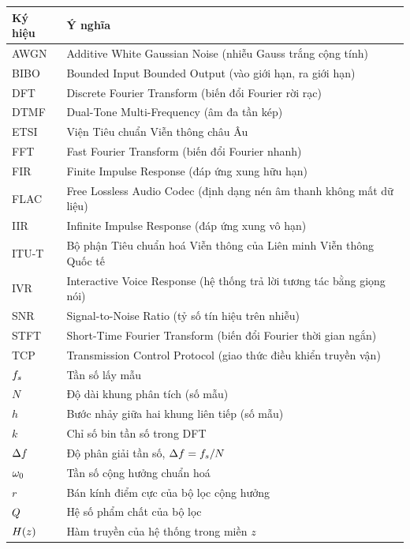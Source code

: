 \documentclass{dtmf_report}
\begin{document}
{\small{}%
\begin{longtable}{@{}p{2cm} p{\dimexpr\linewidth-2cm-2\tabcolsep\relax}@{}}
\toprule
\textbf{Ký hiệu} & \textbf{Ý nghĩa} \\
\midrule
\endhead
AWGN   & Additive White Gaussian Noise (nhiễu Gauss trắng cộng tính) \\
BIBO   & Bounded Input Bounded Output (vào giới hạn, ra giới hạn) \\
DFT    & Discrete Fourier Transform (biến đổi Fourier rời rạc) \\
DTMF   & Dual-Tone Multi-Frequency (âm đa tần kép) \\
ETSI   & Viện Tiêu chuẩn Viễn thông châu Âu \\
FFT    & Fast Fourier Transform (biến đổi Fourier nhanh) \\
FIR    & Finite Impulse Response (đáp ứng xung hữu hạn) \\
FLAC   & Free Lossless Audio Codec (định dạng nén âm thanh không mất dữ liệu) \\
IIR    & Infinite Impulse Response (đáp ứng xung vô hạn) \\
\mbox{ITU-T}  & Bộ phận Tiêu chuẩn hoá Viễn thông của Liên minh Viễn thông Quốc tế \\
IVR    & Interactive Voice Response (hệ thống trả lời tương tác bằng giọng nói) \\
SNR    & Signal-to-Noise Ratio (tỷ số tín hiệu trên nhiễu) \\
STFT   & Short-Time Fourier Transform (biến đổi Fourier thời gian ngắn) \\
TCP    & Transmission Control Protocol (giao thức điều khiển truyền vận) \\
\midrule
$f_{s}$        & Tần số lấy mẫu \\
$N$          & Độ dài khung phân tích (số mẫu) \\
$h$          & Bước nhảy giữa hai khung liên tiếp (số mẫu) \\
$k$          & Chỉ số bin tần số trong DFT \\
$\Delta f$     & Độ phân giải tần số, $\Delta f = f_{s}/N$ \\
$\omega_{0}$     & Tần số cộng hưởng chuẩn hoá \\
$r$          & Bán kính điểm cực của bộ lọc cộng hưởng \\
$Q$      & Hệ số phẩm chất của bộ lọc \\
$H(z)$       & Hàm truyền của hệ thống trong miền $z$ \\

\end{longtable}}
\end{document}
